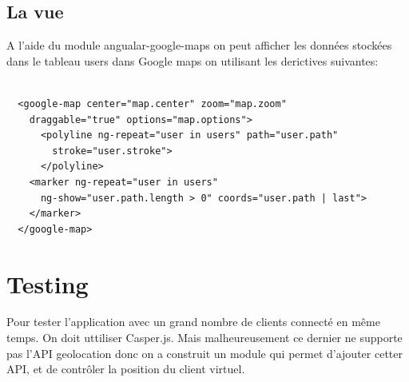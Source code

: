 \documentclass[a4paper]{article}
\begin{document}
\subsection{La vue}

A l'aide du module angualar-google-maps on peut afficher les données stockées dans le 
tableau users dans Google maps on utilisant les derictives suivantes:

\begin{lstlisting}

  <google-map center="map.center" zoom="map.zoom" 
    draggable="true" options="map.options">
      <polyline ng-repeat="user in users" path="user.path" 
        stroke="user.stroke">
      </polyline>
    <marker ng-repeat="user in users" 
      ng-show="user.path.length > 0" coords="user.path | last">
    </marker>
  </google-map>
\end{lstlisting}


\section{Testing}

Pour tester l'application avec un grand nombre de clients connecté en même temps.
On doit uttiliser Casper.js. Mais malheureusement ce dernier ne supporte pas
l'API geolocation donc on a construit un module qui permet d'ajouter cetter API, 
et de contrôler la position du client virtuel.
\end{document}
